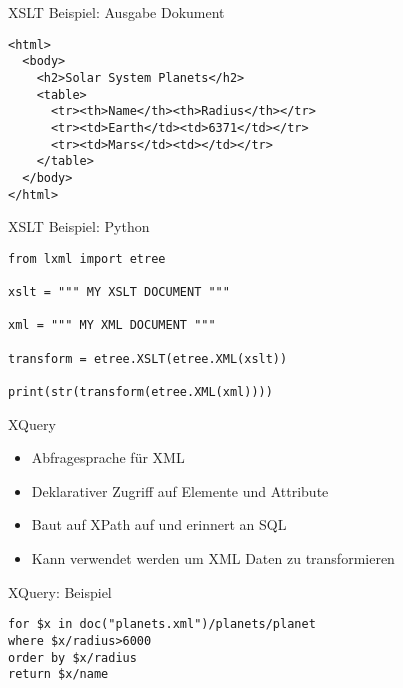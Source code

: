 \documentclass{beamer}
\begin{document}
\begin{frame}[fragile]{XSLT Beispiel: Ausgabe Dokument}
	
	\lstset{language=HTML}
	\begin{lstlisting}
<html>
  <body>
    <h2>Solar System Planets</h2>
    <table>
      <tr><th>Name</th><th>Radius</th></tr>
      <tr><td>Earth</td><td>6371</td></tr>
      <tr><td>Mars</td><td></td></tr>
    </table>
  </body>
</html>
	\end{lstlisting}
	
\end{frame}

\begin{frame}[fragile]{XSLT Beispiel: Python}
	
	\lstset{language=Python}
	\begin{lstlisting}
from lxml import etree

xslt = """ MY XSLT DOCUMENT """

xml = """ MY XML DOCUMENT """

transform = etree.XSLT(etree.XML(xslt))

print(str(transform(etree.XML(xml))))
	\end{lstlisting}
	
\end{frame}

\begin{frame}{XQuery}
	
	\begin{itemize}
		\item Abfragesprache für XML
		\item Deklarativer Zugriff auf Elemente und Attribute
		\item Baut auf XPath auf und erinnert an SQL
		\item Kann verwendet werden um XML Daten zu transformieren
	\end{itemize}
	
\end{frame}

\begin{frame}[fragile]{XQuery: Beispiel}
	
	\lstset{language=}
	\begin{lstlisting}
for $x in doc("planets.xml")/planets/planet
where $x/radius>6000
order by $x/radius
return $x/name
	\end{lstlisting}
	
\end{frame}
\end{document}

